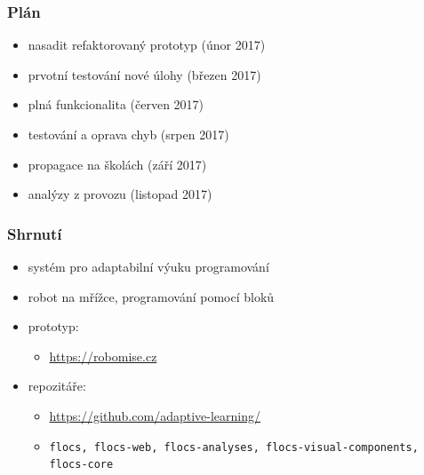 \documentclass[xcolor=dvipsnames, 14pt]{beamer}
\begin{document}
\begin{frame}
\frametitle{Plán}
\begin{itemize}
\item nasadit refaktorovaný prototyp (únor 2017) %
\item prvotní testování nové úlohy (březen 2017)
\item plná funkcionalita (červen 2017)
\item testování a oprava chyb (srpen 2017)
\item propagace na školách (září  2017)
\item analýzy z provozu (listopad 2017)
\end{itemize}
\end{frame}

\begin{frame}
\frametitle{Shrnutí}
\begin{itemize}
\item systém pro adaptabilní výuku programování %
\item robot na mřížce, programování pomocí bloků
\item prototyp:\\
  \begin{itemize}
  \item {\footnotesize \url{https://robomise.cz}}
  \end{itemize}
\item repozitáře:\\
  \begin{itemize}
  \item {\footnotesize \url{https://github.com/adaptive-learning/}}
  \item {\footnotesize \texttt{flocs, flocs-web, flocs-analyses, flocs-visual-components, flocs-core}}
  \end{itemize}
\end{itemize}
\end{frame}
\end{document}
